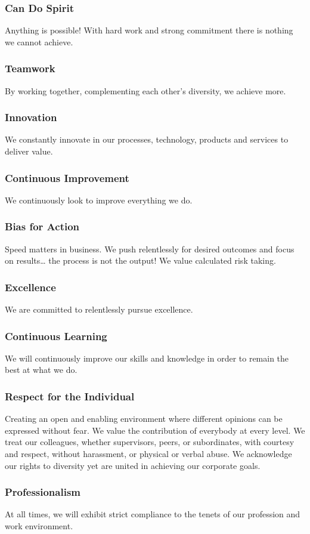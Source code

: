 \subsubsection{Can Do Spirit} Anything is possible! With hard work and strong commitment there is   nothing we cannot achieve.
\subsubsection{Teamwork} By working together, complementing each other’s diversity, we achieve more.
\subsubsection{Innovation} We constantly innovate in our processes, technology, products and services to deliver value.
\subsubsection{Continuous Improvement} We continuously look to improve everything we do.
\subsubsection{Bias for Action} Speed matters in business. We push relentlessly for desired outcomes and focus on results… the process is not the output! We value calculated risk taking.
\subsubsection{Excellence} We are committed to relentlessly pursue excellence.
\subsubsection{Continuous Learning} We will continuously improve our skills and knowledge in order to remain the best at what we do.
\subsubsection{Respect for the Individual} Creating an open and enabling environment where different opinions can be expressed without fear. We value the   contribution of everybody at every level. We treat our colleagues, whether supervisors, peers, or subordinates, with courtesy and respect, without harassment, or physical or verbal abuse. We acknowledge our rights to diversity yet are united in achieving our corporate goals.
\subsubsection{Professionalism} At all times, we will exhibit strict compliance to the tenets of our profession and work environment.

